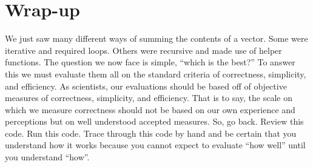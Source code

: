 \documentclass[]{tufte-handout}
\begin{document}
\section{Wrap-up}

We just saw many different ways of summing the contents of a vector.  Some were iterative and required loops.  Others were recursive and made use of helper functions.  The question we now face is simple, ``which is the best?''  To answer this we must evaluate them all on the standard criteria of correctness, simplicity, and efficiency. As scientists, our evaluations should be based off of objective measures of correctness, simplicity, and efficiency. That is to say, the scale on which we measure correctness should not be based on our own experience and perceptions but on well understood accepted measures. So, go back. Review this code. Run this code. Trace through this code by hand and be certain that you understand how it works because you cannot expect to evaluate ``how well'' until you understand ``how''.

	
\end{document}
